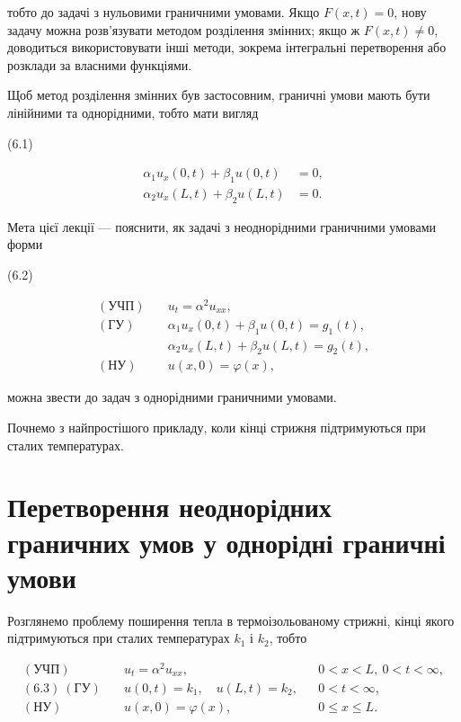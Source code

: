 \documentclass[
  ukrainian,
]{article}
\begin{document}
тобто до задачі з нульовими граничними умовами. Якщо \(F(x,t)=0\), нову
задачу можна розв'язувати методом розділення змінних; якщо ж
\(F(x,t)\neq 0\), доводиться використовувати інші методи, зокрема
інтегральні перетворення або розклади за власними функціями.

Щоб метод розділення змінних був застосовним, граничні умови мають бути
лінійними та однорідними, тобто мати вигляд

(6.1)

\[
\begin{aligned}
\alpha_1 u_x(0,t) + \beta_1 u(0,t) &= 0, \\
\alpha_2 u_x(L,t) + \beta_2 u(L,t) &= 0.
\end{aligned}
\]

Мета цієї лекції --- пояснити, як задачі з неоднорідними граничними
умовами форми

(6.2)

\[
\begin{aligned}
(\text{УЧП})\quad & u_t = \alpha^2 u_{xx}, \\
(\text{ГУ})\quad & \alpha_1 u_x(0,t) + \beta_1 u(0,t) = g_1(t), \\
& \alpha_2 u_x(L,t) + \beta_2 u(L,t) = g_2(t), \\
(\text{НУ})\quad & u(x,0) = \varphi(x),
\end{aligned}
\]

можна звести до задач з однорідними граничними умовами.

Почнемо з найпростішого прикладу, коли кінці стрижня підтримуються при
сталих температурах.

\section{Перетворення неоднорідних граничних умов у однорідні граничні
умови}\label{ux43fux435ux440ux435ux442ux432ux43eux440ux435ux43dux43dux44f-ux43dux435ux43eux434ux43dux43eux440ux456ux434ux43dux438ux445-ux433ux440ux430ux43dux438ux447ux43dux438ux445-ux443ux43cux43eux432-ux443-ux43eux434ux43dux43eux440ux456ux434ux43dux456-ux433ux440ux430ux43dux438ux447ux43dux456-ux443ux43cux43eux432ux438}

Розглянемо проблему поширення тепла в термоізольованому стрижні, кінці
якого підтримуються при сталих температурах \(k_1\) і \(k_2\), тобто

\[
\begin{aligned}
(\text{УЧП})\quad & u_t = \alpha^2 u_{xx}, && 0 < x < L,\ 0 < t < \infty, \\
(6.3)\ (\text{ГУ})\quad & u(0,t) = k_1,\quad u(L,t) = k_2, && 0 < t < \infty, \\
(\text{НУ})\quad & u(x,0) = \varphi(x), && 0 \leqslant x \leqslant L.
\end{aligned}
\]
\end{document}
